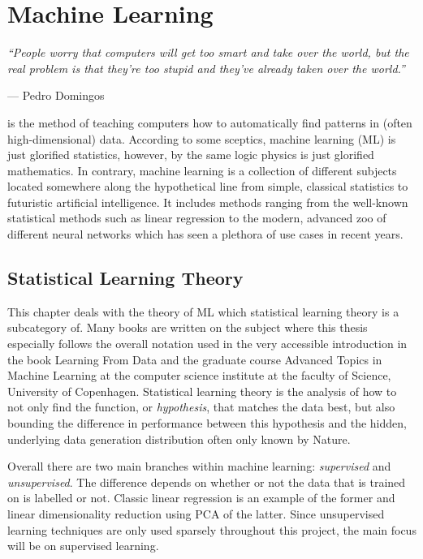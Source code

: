 
\chapter{Machine Learning}
\label{ch:ML_theory}

\epigraph{\textit{``People worry that computers will get too smart and take over the world, but the real problem is that they're too stupid and they've already taken over the world.''}}{--- Pedro Domingos}

 is the method of teaching computers how to automatically find patterns in (often high-dimensional) data. According to some sceptics, machine learning (ML) is just glorified statistics, however, by the same logic physics is just glorified mathematics. In contrary, machine learning is a collection of different subjects located somewhere along the hypothetical line from simple, classical statistics to futuristic artificial intelligence. It includes methods ranging from the well-known statistical methods such as linear regression to the modern, advanced zoo of different neural networks \citep{veenNeuralNetworkZoo2016} which has seen a plethora of use cases in recent years. 

\section{Statistical Learning Theory}
This chapter deals with the theory of ML which statistical learning theory is a subcategory of. Many books are written on the subject where this thesis especially follows the overall notation used in the very accessible introduction in the book Learning From Data \citep{abu-mostafaLearningData2012} and the graduate course Advanced Topics in Machine Learning \citep{AdvancedTopicsMachine} at the computer science institute at the faculty of Science, University of Copenhagen. Statistical learning theory is the analysis of how to not only find the function, or \emph{hypothesis}, that matches the data best, but also bounding the difference in performance between this hypothesis and the hidden, underlying data generation distribution often only known by Nature. 

Overall there are two main branches within machine learning: \emph{supervised} and \emph{unsupervised}. The difference depends on whether or not the data that is trained on is labelled or not. Classic linear regression is an example of the former and linear dimensionality reduction using PCA of the latter. Since unsupervised learning techniques are only used sparsely throughout this project, the main focus will be on supervised learning. 

